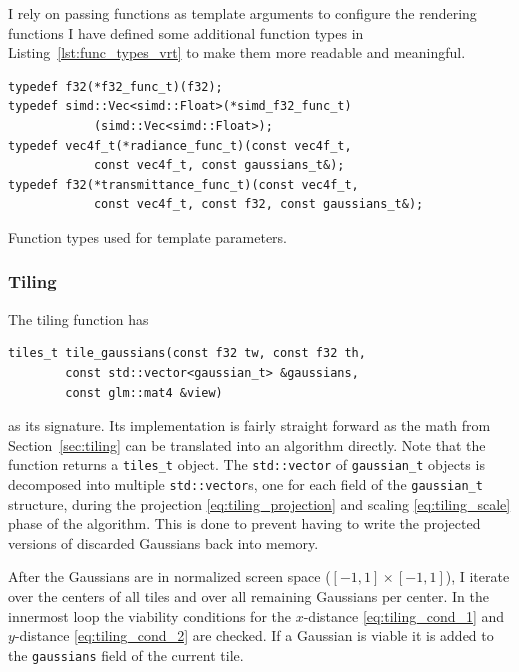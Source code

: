 \documentclass[a4paper, 11pt]{memoir}
\begin{document}
    I rely on passing functions as template arguments to configure the rendering functions I have defined some
    additional function types in Listing~\ref{lst:func_types_vrt} to make them more readable and meaningful.

    \begin{listing}[H]
        \begin{verbatim}
typedef f32(*f32_func_t)(f32);
typedef simd::Vec<simd::Float>(*simd_f32_func_t)
            (simd::Vec<simd::Float>);
typedef vec4f_t(*radiance_func_t)(const vec4f_t,
            const vec4f_t, const gaussians_t&);
typedef f32(*transmittance_func_t)(const vec4f_t,
            const vec4f_t, const f32, const gaussians_t&);
        \end{verbatim}
        \caption{Function types used for template parameters.}
        \label{lst:func_types_vrt}
    \end{listing}

    \subsubsection{Tiling}
    The tiling function has
    \begin{verbatim}
tiles_t tile_gaussians(const f32 tw, const f32 th,
        const std::vector<gaussian_t> &gaussians,
        const glm::mat4 &view)
    \end{verbatim}
    as its signature. Its implementation is fairly straight forward as the math from Section~\ref{sec:tiling} can be
    translated into an algorithm directly. Note that the function returns a \texttt{tiles_t} object. The
    \texttt{std::vector} of \texttt{gaussian_t} objects is decomposed into
    multiple \texttt{std::vector}s, one for each field of the \texttt{gaussian_t} structure, during
    the projection \eqref{eq:tiling_projection} and scaling \eqref{eq:tiling_scale} phase of the algorithm. This is done
    to prevent having to write the projected versions of discarded Gaussians back into memory.

    After the Gaussians are in normalized screen space ($[-1, 1] \times [-1, 1]$), I iterate over the centers of all
    tiles and over all remaining Gaussians per center. In the innermost loop the viability conditions for the $x$-distance
    \eqref{eq:tiling_cond_1} and $y$-distance \eqref{eq:tiling_cond_2} are checked. If a Gaussian is viable it is
    added to the \texttt{gaussians} field of the current tile.
\end{document}
